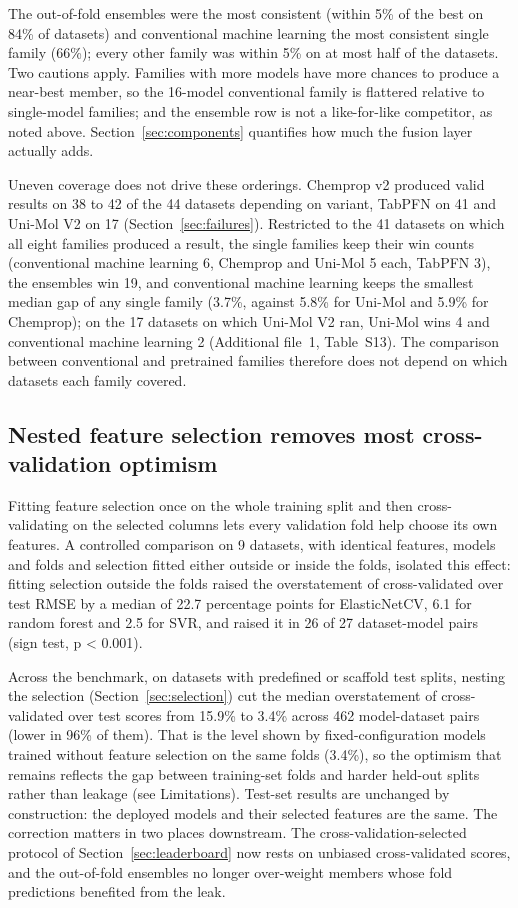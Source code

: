 The out-of-fold ensembles were the most consistent (within 5\% of the best on 84\% of datasets) and conventional machine learning the most consistent single family (66\%); every other family was within 5\% on at most half of the datasets. Two cautions apply. Families with more models have more chances to produce a near-best member, so the 16-model conventional family is flattered relative to single-model families; and the ensemble row is not a like-for-like competitor, as noted above. Section~\ref{sec:components} quantifies how much the fusion layer actually adds.

Uneven coverage does not drive these orderings. Chemprop v2 produced valid results on 38 to 42 of the 44 datasets depending on variant, TabPFN on 41 and Uni-Mol V2 on 17 (Section~\ref{sec:failures}). Restricted to the 41 datasets on which all eight families produced a result, the single families keep their win counts (conventional machine learning 6, Chemprop and Uni-Mol 5 each, TabPFN 3), the ensembles win 19, and conventional machine learning keeps the smallest median gap of any single family (3.7\%, against 5.8\% for Uni-Mol and 5.9\% for Chemprop); on the 17 datasets on which Uni-Mol V2 ran, Uni-Mol wins 4 and conventional machine learning 2 (Additional file~1, Table~S13). The comparison between conventional and pretrained families therefore does not depend on which datasets each family covered.

\subsection{Nested feature selection removes most cross-validation optimism}\label{sec:nestedcv}

Fitting feature selection once on the whole training split and then cross-validating on the selected columns lets every validation fold help choose its own features. A controlled comparison on 9 datasets, with identical features, models and folds and selection fitted either outside or inside the folds, isolated this effect: fitting selection outside the folds raised the overstatement of cross-validated over test RMSE by a median of 22.7 percentage points for ElasticNetCV, 6.1 for random forest and 2.5 for SVR, and raised it in 26 of 27 dataset-model pairs (sign test, p < 0.001).

Across the benchmark, on datasets with predefined or scaffold test splits, nesting the selection (Section~\ref{sec:selection}) cut the median overstatement of cross-validated over test scores from 15.9\% to 3.4\% across 462 model-dataset pairs (lower in 96\% of them). That is the level shown by fixed-configuration models trained without feature selection on the same folds (3.4\%), so the optimism that remains reflects the gap between training-set folds and harder held-out splits rather than leakage (see Limitations). Test-set results are unchanged by construction: the deployed models and their selected features are the same. The correction matters in two places downstream. The cross-validation-selected protocol of Section~\ref{sec:leaderboard} now rests on unbiased cross-validated scores, and the out-of-fold ensembles no longer over-weight members whose fold predictions benefited from the leak.

